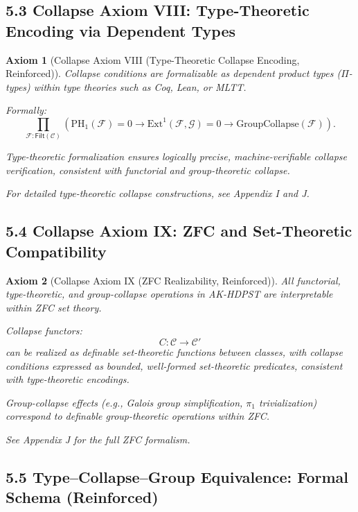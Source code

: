 \documentclass[11pt]{article}
\newtheorem{axiom}{Axiom}[section]
\begin{document}
\subsection*{5.3 Collapse Axiom VIII: Type-Theoretic Encoding via Dependent Types}

\begin{axiom}[Collapse Axiom VIII (Type-Theoretic Collapse Encoding, Reinforced)]
Collapse conditions are formalizable as dependent product types (\(\Pi\)-types) within type theories such as Coq, Lean, or MLTT.

Formally:
\[
\prod_{\mathcal{F}:\mathsf{Filt}(\mathcal{C})} \left( \mathrm{PH}_1(\mathcal{F}) = 0 \rightarrow \mathrm{Ext}^1(\mathcal{F}, \mathcal{G}) = 0 \rightarrow \text{GroupCollapse}(\mathcal{F}) \right).
\]

Type-theoretic formalization ensures logically precise, machine-verifiable collapse verification, consistent with functorial and group-theoretic collapse.

For detailed type-theoretic collapse constructions, see Appendix I and J.
\end{axiom}

\subsection*{5.4 Collapse Axiom IX: ZFC and Set-Theoretic Compatibility}

\begin{axiom}[Collapse Axiom IX (ZFC Realizability, Reinforced)]
All functorial, type-theoretic, and group-collapse operations in AK-HDPST are interpretable within ZFC set theory.

Collapse functors:
\[
C: \mathcal{C} \to \mathcal{C}'
\]
can be realized as definable set-theoretic functions between classes,  
with collapse conditions expressed as bounded, well-formed set-theoretic predicates, consistent with type-theoretic encodings.

Group-collapse effects (e.g., Galois group simplification, \(\pi_1\) trivialization) correspond to definable group-theoretic operations within ZFC.

See Appendix J for the full ZFC formalism.
\end{axiom}

\subsection*{5.5 Type–Collapse–Group Equivalence: Formal Schema (Reinforced)}
\end{document}
